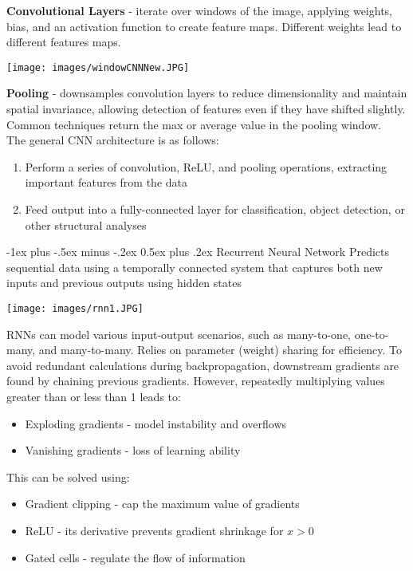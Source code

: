 \documentclass[10pt,landscape]{article}
\makeatletter
\renewcommand{\section}{\@startsection{section}{1}{0mm}%
                                {-1ex plus -.5ex minus -.2ex}%
                                {0.5ex plus .2ex}%
                                {\normalfont\large\bfseries}}
\makeatother
\begin{document}
\begin{multicols}{3}
\textbf{Convolutional Layers} - iterate over windows of the image, applying weights, bias, and an activation function to create feature maps. Different weights lead to different features maps.
\vspace{-4mm}
\begin{center}
    \texttt{[image: images/windowCNNNew.JPG]}
\end{center}
\vspace{-2mm}
\textbf{Pooling} - downsamples convolution layers to reduce dimensionality and maintain spatial invariance, allowing detection of features even if they have shifted slightly. Common techniques return the max or average value in the pooling window.\\
\smallskip
The general CNN architecture is as follows:
\begin{enumerate}[leftmargin=5mm]
\itemsep -.4mm
\item Perform a series of convolution, ReLU, and pooling operations, extracting important features from the data
\item Feed output into a fully-connected layer for classification, object detection, or other structural analyses
\end{enumerate}

\section{Recurrent Neural Network}
Predicts sequential data using a temporally connected system that captures both new inputs and previous outputs using hidden states
\begin{center}
\vspace{-2mm}
    \texttt{[image: images/rnn1.JPG]}
\end{center}
\vspace{-2mm}

RNNs can model various input-output scenarios, such as many-to-one, one-to-many, and many-to-many. Relies on parameter (weight) sharing for efficiency. To avoid redundant calculations during backpropagation, downstream gradients are found by chaining previous gradients. However, repeatedly multiplying values greater than or less than 1 leads to:
\begin{itemize}[label={--},leftmargin=4mm]
\itemsep -.4mm
\item Exploding gradients - model instability and overflows
\item Vanishing gradients - loss of learning ability
\end{itemize}
This can be solved using:
\begin{itemize}[label={--},leftmargin=4mm]
\itemsep -.4mm
\item Gradient clipping - cap the maximum value of gradients
\item ReLU - its derivative prevents gradient shrinkage for $x > 0$
\item Gated cells - regulate the flow of information
\end{itemize}


\end{multicols}
\end{document}
